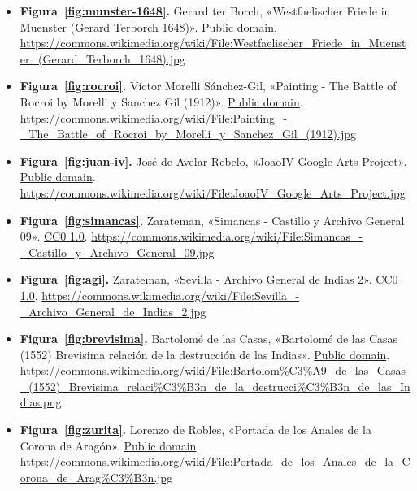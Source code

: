 \documentclass{book}
\begin{document}
\begin{itemize}
\item \textbf{Figura~\ref{fig:munster-1648}.} Gerard ter Borch, «Westfaelischer Friede in Muenster (Gerard Terborch 1648)». \href{https://creativecommons.org/publicdomain/mark/1.0/}{Public domain}. \url{https://commons.wikimedia.org/wiki/File:Westfaelischer_Friede_in_Muenster_(Gerard_Terborch_1648).jpg}
\item \textbf{Figura~\ref{fig:rocroi}.} Víctor Morelli Sánchez-Gil, «Painting - The Battle of Rocroi by Morelli y Sanchez Gil (1912)». \href{https://creativecommons.org/publicdomain/mark/1.0/}{Public domain}. \url{https://commons.wikimedia.org/wiki/File:Painting_-_The_Battle_of_Rocroi_by_Morelli_y_Sanchez_Gil_(1912).jpg}
\item \textbf{Figura~\ref{fig:juan-iv}.} José de Avelar Rebelo, «JoaoIV Google Arts Project». \href{https://creativecommons.org/publicdomain/mark/1.0/}{Public domain}. \url{https://commons.wikimedia.org/wiki/File:JoaoIV_Google_Arts_Project.jpg}
\item \textbf{Figura~\ref{fig:simancas}.} Zarateman, «Simancas - Castillo y Archivo General 09». \href{https://creativecommons.org/publicdomain/zero/1.0/}{CC0 1.0}. \url{https://commons.wikimedia.org/wiki/File:Simancas_-_Castillo_y_Archivo_General_09.jpg}
\item \textbf{Figura~\ref{fig:agi}.} Zarateman, «Sevilla - Archivo General de Indias 2». \href{https://creativecommons.org/publicdomain/zero/1.0/}{CC0 1.0}. \url{https://commons.wikimedia.org/wiki/File:Sevilla_-_Archivo_General_de_Indias_2.jpg}
\item \textbf{Figura~\ref{fig:brevisima}.} Bartolomé de las Casas, «Bartolomé de las Casas (1552) Brevisima relación de la destrucción de las Indias». \href{https://creativecommons.org/publicdomain/mark/1.0/}{Public domain}. \url{https://commons.wikimedia.org/wiki/File:Bartolom%C3%A9_de_las_Casas_(1552)_Brevisima_relaci%C3%B3n_de_la_destrucci%C3%B3n_de_las_Indias.png}
\item \textbf{Figura~\ref{fig:zurita}.} Lorenzo de Robles, «Portada de los Anales de la Corona de Aragón». \href{https://creativecommons.org/publicdomain/mark/1.0/}{Public domain}. \url{https://commons.wikimedia.org/wiki/File:Portada_de_los_Anales_de_la_Corona_de_Arag%C3%B3n.jpg}
\end{itemize}
\backmatter
\end{document}
